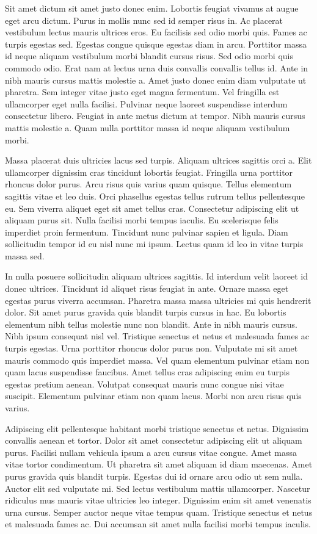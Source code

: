 \documentclass[11pt,a4paper]{article}
\begin{document}
Sit amet dictum sit amet justo donec enim. Lobortis feugiat vivamus at augue eget arcu dictum. Purus in mollis nunc sed id semper risus in. Ac placerat vestibulum lectus mauris ultrices eros. Eu facilisis sed odio morbi quis. Fames ac turpis egestas sed. Egestas congue quisque egestas diam in arcu. Porttitor massa id neque aliquam vestibulum morbi blandit cursus risus. Sed odio morbi quis commodo odio. Erat nam at lectus urna duis convallis convallis tellus id. Ante in nibh mauris cursus mattis molestie a. Amet justo donec enim diam vulputate ut pharetra. Sem integer vitae justo eget magna fermentum. Vel fringilla est ullamcorper eget nulla facilisi. Pulvinar neque laoreet suspendisse interdum consectetur libero. Feugiat in ante metus dictum at tempor. Nibh mauris cursus mattis molestie a. Quam nulla porttitor massa id neque aliquam vestibulum morbi.

Massa placerat duis ultricies lacus sed turpis. Aliquam ultrices sagittis orci a. Elit ullamcorper dignissim cras tincidunt lobortis feugiat. Fringilla urna porttitor rhoncus dolor purus. Arcu risus quis varius quam quisque. Tellus elementum sagittis vitae et leo duis. Orci phasellus egestas tellus rutrum tellus pellentesque eu. Sem viverra aliquet eget sit amet tellus cras. Consectetur adipiscing elit ut aliquam purus sit. Nulla facilisi morbi tempus iaculis. Eu scelerisque felis imperdiet proin fermentum. Tincidunt nunc pulvinar sapien et ligula. Diam sollicitudin tempor id eu nisl nunc mi ipsum. Lectus quam id leo in vitae turpis massa sed.

In nulla posuere sollicitudin aliquam ultrices sagittis. Id interdum velit laoreet id donec ultrices. Tincidunt id aliquet risus feugiat in ante. Ornare massa eget egestas purus viverra accumsan. Pharetra massa massa ultricies mi quis hendrerit dolor. Sit amet purus gravida quis blandit turpis cursus in hac. Eu lobortis elementum nibh tellus molestie nunc non blandit. Ante in nibh mauris cursus. Nibh ipsum consequat nisl vel. Tristique senectus et netus et malesuada fames ac turpis egestas. Urna porttitor rhoncus dolor purus non. Vulputate mi sit amet mauris commodo quis imperdiet massa. Vel quam elementum pulvinar etiam non quam lacus suspendisse faucibus. Amet tellus cras adipiscing enim eu turpis egestas pretium aenean. Volutpat consequat mauris nunc congue nisi vitae suscipit. Elementum pulvinar etiam non quam lacus. Morbi non arcu risus quis varius.

Adipiscing elit pellentesque habitant morbi tristique senectus et netus. Dignissim convallis aenean et tortor. Dolor sit amet consectetur adipiscing elit ut aliquam purus. Facilisi nullam vehicula ipsum a arcu cursus vitae congue. Amet massa vitae tortor condimentum. Ut pharetra sit amet aliquam id diam maecenas. Amet purus gravida quis blandit turpis. Egestas dui id ornare arcu odio ut sem nulla. Auctor elit sed vulputate mi. Sed lectus vestibulum mattis ullamcorper. Nascetur ridiculus mus mauris vitae ultricies leo integer. Dignissim enim sit amet venenatis urna cursus. Semper auctor neque vitae tempus quam. Tristique senectus et netus et malesuada fames ac. Dui accumsan sit amet nulla facilisi morbi tempus iaculis.
\end{document}
